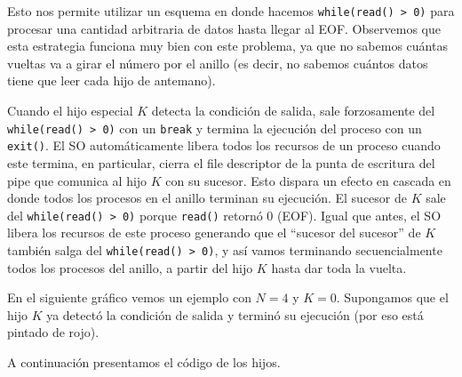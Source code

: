 Esto nos permite utilizar un esquema en donde hacemos \texttt{while(read() > 0)} para procesar una cantidad arbitraria de datos hasta llegar al EOF. Observemos que esta estrategia funciona muy bien con este problema, ya que no sabemos cuántas vueltas va a girar el número por el anillo (es decir, no sabemos cuántos datos tiene que leer cada hijo de antemano).

Cuando el hijo especial $K$ detecta la condición de salida, sale forzosamente del \texttt{while(read() > 0)} con un \texttt{break} y termina la ejecución del proceso con un \texttt{exit()}. El SO automáticamente libera todos los recursos de un proceso cuando este termina, en particular, cierra el file descriptor de la punta de escritura del pipe que comunica al hijo $K$ con su sucesor. Esto dispara un efecto en cascada en donde todos los procesos en el anillo terminan su ejecución. El sucesor de $K$ sale del \texttt{while(read() > 0)} porque \texttt{read()} retornó 0 (EOF). Igual que antes, el SO libera los recursos de este proceso generando que el ``sucesor del sucesor'' de $K$ también salga del \texttt{while(read() > 0)}, y así vamos terminando secuencialmente todos los procesos del anillo, a partir del hijo $K$ hasta dar toda la vuelta.

En el siguiente gráfico vemos un ejemplo con $N = 4$ y $K = 0$. Supongamos que el hijo $K$ ya detectó la condición de salida y terminó su ejecución (por eso está pintado de rojo).



A continuación presentamos el código de los hijos.


\pagebreak

